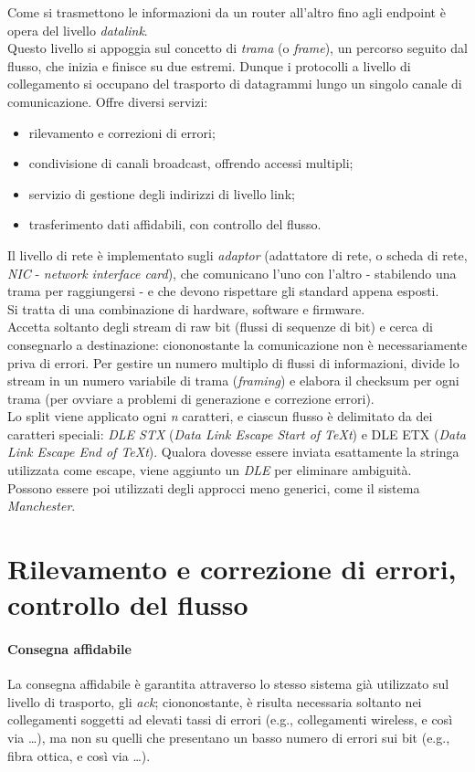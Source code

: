 Come si trasmettono le informazioni da un router all'altro fino agli endpoint è opera del livello \textit{datalink}. \\
Questo livello si appoggia sul concetto di \textit{trama} (o \textit{frame}), un percorso seguito dal flusso, che inizia e finisce su due estremi. Dunque i protocolli a livello di collegamento si occupano del trasporto di datagrammi lungo un singolo canale di comunicazione. Offre diversi servizi:
\begin{itemize}
	\item rilevamento e correzioni di errori;
	\item condivisione di canali broadcast, offrendo accessi multipli;
	\item servizio di gestione degli indirizzi di livello link;
	\item trasferimento dati affidabili, con controllo del flusso.
\end{itemize}
Il livello di rete è implementato sugli \textit{adaptor} (adattatore di rete, o scheda di rete, \textit{NIC} - \textit{network interface card}), che comunicano l'uno con l'altro - stabilendo una trama per raggiungersi - e che devono rispettare gli standard appena esposti. \\
Si tratta di una combinazione di hardware, software e firmware. \\
Accetta soltanto degli stream di raw bit (flussi di sequenze di bit) e cerca di consegnarlo a destinazione: ciononostante la comunicazione non è necessariamente priva di errori. Per gestire un numero multiplo di flussi di informazioni, divide lo stream in un numero variabile di trama (\textit{framing}) e elabora il checksum per ogni trama (per ovviare a problemi di generazione e correzione errori). \\
Lo split viene applicato ogni \textit{n} caratteri, e ciascun flusso è delimitato da dei caratteri speciali: \textit{DLE STX} (\textit{Data Link Escape Start of TeXt}) e DLE ETX (\textit{Data Link Escape End of TeXt}). Qualora dovesse essere inviata esattamente la stringa utilizzata come escape, viene aggiunto un \textit{DLE} per eliminare ambiguità. \\
Possono essere poi utilizzati degli approcci meno generici, come il sistema \textit{Manchester}.

\section{Rilevamento e correzione di errori, controllo del flusso}
\paragraph{Consegna affidabile}
La consegna affidabile è garantita attraverso lo stesso sistema già utilizzato sul livello di trasporto, gli \textit{ack}; ciononostante, è risulta necessaria soltanto nei collegamenti soggetti ad elevati tassi di errori (e.g., collegamenti wireless, e così via \ldots), ma non su quelli che presentano un basso numero di errori sui bit (e.g., fibra ottica, e così via \ldots).

